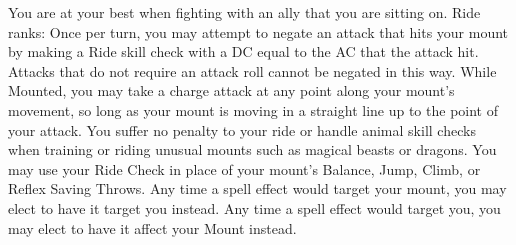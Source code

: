 \skillfeat
{You are at your best when fighting with an ally that you are sitting on.}
{Ride ranks:}
{Once per turn, you may attempt to negate an attack that hits your mount by making a Ride skill check with a DC equal to the AC that the attack hit. Attacks that do not require an attack roll cannot be negated in this way.}
{While Mounted, you may take a charge attack at any point along your mount's movement, so long as your mount is moving in a straight line up to the point of your attack.}
{You suffer no penalty to your ride or handle animal skill checks when training or riding unusual mounts such as magical beasts or dragons.}
{You may use your Ride Check in place of your mount's Balance, Jump, Climb, or Reflex Saving Throws.}
{Any time a spell effect would target your mount, you may elect to have it target you instead. Any time a spell effect would target you, you may elect to have it affect your Mount instead.}